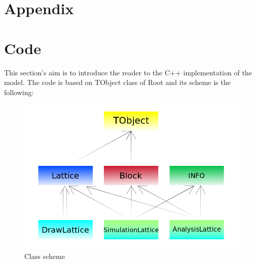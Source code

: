 \documentclass[11pt,a4paper]{article}
\begin{document}
 


\newpage

\section{Appendix}



\newpage

\section{Code}
This section's aim is to introduce the reader to the C++ implementation of the model. The code is based on TObject class of Root and its scheme is the following:

\begin{figure}[h!]
  \centering
  \includegraphics[scale=0.45]{img/Schema_classi.png}
  \caption{Class scheme}
\end{figure}



%   











\end{document}
